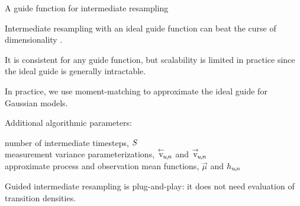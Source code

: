 \documentclass{beamer}
\begin{document}
\begin{frame}{A guide function for intermediate resampling}

  \begin{myitemize}

  \item Intermediate resampling with an ideal guide function can beat the curse of dimensionality \citep{park20}.

    \vspace{3mm}
    
  \item  It is consistent for any guide function, but scalability is limited in practice since the ideal guide is generally intractable.

    \vspace{3mm}
    
    \item In practice, we use moment-matching to approximate the ideal guide for Gaussian models. 

      \vspace{3mm}
      
    \item Additional algorithmic parameters:\\

      \vspace{1mm}
      
      number of intermediate timesteps, $S$ \\
      measurement variance parameterizations, ${\stackrel{\leftarrow}{\mathrm{v}}\!}_{u{\hspace{-0.25mm},\hspace{-0.2mm}}n}$ and ${\stackrel{\rightarrow}{\mathrm{v}}\!}_{u{\hspace{-0.25mm},\hspace{-0.2mm}}n}$\\
      approximate process and observation mean functions, $\vec{\mu}$ and $h_{u{\hspace{-0.25mm},\hspace{-0.2mm}}n}$

\vspace{3mm}
      
\item Guided intermediate resampling is plug-and-play: it does not need evaluation of transition densities.

        \end{myitemize}

\end{frame}
\end{document}
